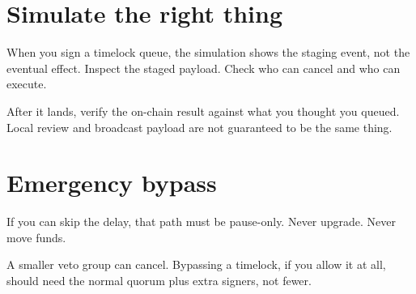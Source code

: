 \section{Simulate the right thing}

When you sign a timelock queue, the simulation
shows the staging event, not the eventual effect.
Inspect the staged payload. Check who can cancel
and who can execute.

After it lands, verify the on-chain result against
what you thought you queued. Local review and
broadcast payload are not guaranteed to be the
same thing.

\section{Emergency bypass}

If you can skip the delay, that path must be
pause-only. Never upgrade. Never move funds.

A smaller veto group can cancel. Bypassing a
timelock, if you allow it at all, should need the
normal quorum plus extra signers, not fewer.
